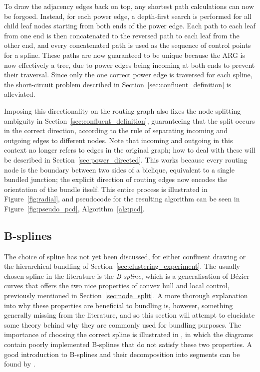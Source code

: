 To draw the adjacency edges back on top, any shortest path calculations can now be forgoed. Instead, for each power edge, a depth-first search is performed for all child leaf nodes starting from both ends of the power edge. Each path to each leaf from one end is then concatenated to the reversed path to each leaf from the other end, and every concatenated path is used as the sequence of control points for a spline.
These paths are now guaranteed to be unique because the ARG is now effectively a tree, due to power edges being incoming at both ends to prevent their traversal. Since only the one correct power edge is traversed for each spline, the short-circuit problem described in Section~\ref{sec:confluent_definition} is alleviated.

Imposing this directionality on the routing graph also fixes the node splitting ambiguity in Section~\ref{sec:confluent_definition}, guaranteeing that the split occurs in the correct direction, according to the rule of separating incoming and outgoing edges to different nodes. Note that incoming and outgoing in this context no longer refers to edges in the original graph; how to deal with these will be described in Section~\ref{sec:power_directed}.
This works because every routing node is the boundary between two sides of a biclique, equivalent to a single bundled junction; the explicit direction of routing edges now encodes the orientation of the bundle itself.
This entire process is illustrated in Figure~\ref{fig:radial}, and pseudocode for the resulting algorithm can be seen in Figure~\ref{fig:pseudo_pcd}, Algorithm~\ref{alg:pcd}.


\subsection{B-splines}
\label{sec:bspline_details}
The choice of spline has not yet been discussed, for either confluent drawing or the hierarchical bundling of Section~\ref{sec:clustering_experiment}. 
The usually chosen spline in the literature is the \emph{B-spline}, which is a generalisation of B\'ezier curves that offers the two nice properties of convex hull and local control, previously mentioned in Section~\ref{sec:node_split}.
A more thorough explanation into why these properties are beneficial to bundling is, however, something generally missing from the literature, and so this section will attempt to elucidate some theory behind why they are commonly used for bundling purposes.
The importance of choosing the correct spline is illustrated in \citet{Jia2011}, in which the diagrams contain poorly implemented B-splines that do not satisfy these two properties.
A good introduction to B-splines and their decomposition into segments can be found by \citet{Sederberg2005}.

